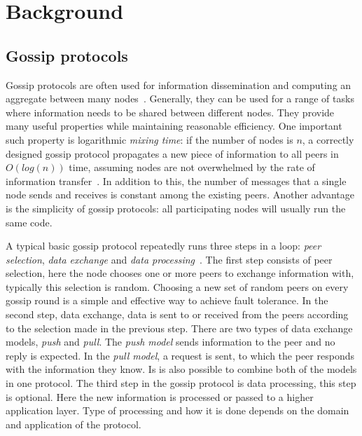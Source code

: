 \section{Background}

\subsection{Gossip protocols}
\label{gossip}

Gossip protocols are often used for information dissemination and computing an aggregate between many nodes~\cite{Birm07}. Generally, they can be used for a range of tasks where information needs to be shared between different nodes.
They provide many useful properties while maintaining reasonable efficiency.
One important such property is logarithmic \emph{mixing time}: if the number of nodes is $n$, a correctly designed gossip protocol propagates a new piece of information to all peers in $O(log(n))$ time, assuming nodes are not overwhelmed by the rate of information transfer~\cite{Birm07}.
In addition to this, the number of messages that a single node sends and receives is constant among the existing peers. Another advantage is the simplicity of gossip protocols: all participating nodes will usually run the same code.

A typical basic gossip protocol repeatedly runs three steps in a loop: \emph{peer selection}, \emph{data exchange} and \emph{data processing}~\cite{Kerm07}.
The first step consists of peer selection, here the node chooses one or more peers to exchange information with, typically this selection is random. Choosing a new set of random peers on every gossip round is a simple and effective way to achieve fault tolerance.
In the second step, data exchange, data is sent to or received from the peers according to the selection made in the previous step. There are two types of data exchange models, \emph{push} and \emph{pull}. The \emph{push model} sends information to the peer and no reply is expected. In the \emph{pull model}, a request is sent, to which the peer responds with the information they know. Is is also possible to combine both of the models in one protocol.
The third step in the gossip protocol is data processing, this step is optional. Here the new information is processed or passed to a higher application layer. Type of processing and how it is done depends on the domain and application of the protocol.

